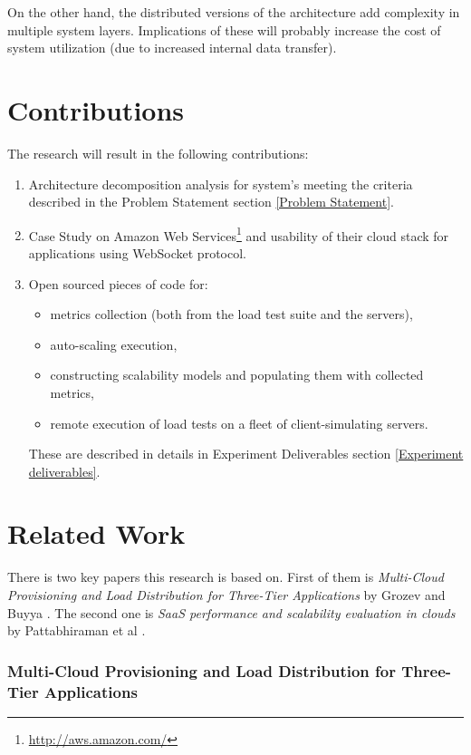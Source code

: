 \documentclass{uvamscse}
\begin{document}
On the other hand, the distributed versions of the architecture add complexity in multiple system layers. Implications of these will probably increase the cost of system utilization (due to increased internal data transfer).

\section{Contributions}
The research will result in the following contributions:

\begin{enumerate}
  \item Architecture decomposition analysis for system's meeting the criteria described in the Problem Statement section \ref{Problem Statement}.
  \item Case Study on Amazon Web Services\footnote{\url{http://aws.amazon.com/}} and usability of their cloud stack for applications using WebSocket protocol.
  \item Open sourced pieces of code for:
  \begin{itemize}
    \item metrics collection (both from the load test suite and the servers),
    \item auto-scaling execution,
    \item constructing scalability models and populating them with collected metrics,
    \item remote execution of load tests on a fleet of client-simulating servers.
  \end{itemize}
  These are described in details in Experiment Deliverables section \ref{Experiment deliverables}.
\end{enumerate}

\section{Related Work}\label{Related Work}

There is two key papers this research is based on. First of them is \textit{Multi-Cloud Provisioning and Load Distribution for Three-Tier Applications} by Grozev and Buyya \cite{GroBuy}. The second one is \textit{SaaS performance and scalability evaluation in clouds} by Pattabhiraman et al \cite{Models}.

\subsubsection{Multi-Cloud Provisioning and Load Distribution for Three-Tier Applications}
\end{document}

